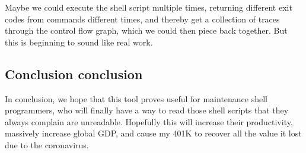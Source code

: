 \documentclass[sigplan]{acmart}
\begin{document}
Maybe we could execute the shell script multiple times,
returning different exit codes from commands different times,
and thereby get a collection of traces through the control flow graph,
which we could then piece back together.
But this is beginning to sound like real work.
\subsection{Conclusion conclusion}
In conclusion,
we hope that this tool proves useful for maintenance shell programmers,
who will finally have a way to read those shell scripts that they always complain are unreadable.
Hopefully this will increase their productivity,
massively increase global GDP,
and cause my 401K to recover all the value it lost due to the coronavirus.



\end{document}
